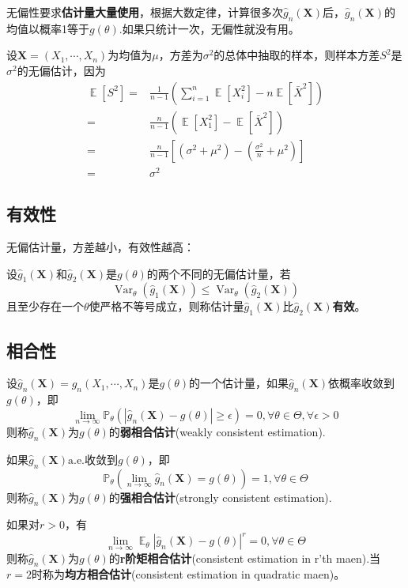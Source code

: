 \documentclass{ctexbook}
\DeclareMathOperator{\Var}{Var}          %
\DeclareMathOperator{\E}{\mathbb{E}}     %
\newcommand{\aee}{\text{a.e.}}             %
\begin{document}
无偏性要求\textbf{估计量大量使用}，根据大数定律，计算很多次$\hat{g}_n(\mathbf{X})$后，$\hat{g}_n(\mathbf{X})$的均值以概率1等于$g(\theta)$.如果只统计一次，无偏性就没有用。

\begin{example}
    设$\mathbf{X}=(X_1,\cdots,X_n)$为均值为$\mu$，方差为$\sigma^2$的总体中抽取的样本，则样本方差$S^2$是$\sigma^2$的无偏估计，因为
    \begin{align*}
        \E[S^2]=&\frac{1}{n-1}\left(\sum_{i=1}^n \E[X_i^2]-n\E[\bar{X}^2]\right)\\
        =&\frac{n}{n-1}(\E[X_1^2]-\E[\bar{X}^2])\\
        =&\frac{n}{n-1}\left[(\sigma^2+\mu^2)-\left(\frac{\sigma^2}{n}+\mu^2\right)\right]\\
        =&\sigma^2
    \end{align*}
\end{example}

\subsection{有效性}

无偏估计量，方差越小，有效性越高：

\begin{definition}[有效性]
    设$\hat{g}_1(\mathbf{X})$和$\hat{g}_2(\mathbf{X})$是$g(\theta)$的两个不同的无偏估计量，若
    $$\Var_\theta(\hat{g}_1(\mathbf{X}))\le \Var_\theta(\hat{g}_2(\mathbf{X}))$$
    且至少存在一个$\theta$使严格不等号成立，则称估计量$\hat{g}_1(\mathbf{X})$比$\hat{g}_2(\mathbf{X})$\textbf{有效}。
\end{definition}

\subsection{相合性}

\begin{definition}[相合性]
    设$\hat{g}_n(\mathbf{X})=\hat{g}_n(X_1,\cdots,X_n)$是$g(\theta)$的一个估计量，如果$\hat{g}_n(\mathbf{X})$依概率收敛到$g(\theta)$，即
    $$\lim_{n\to\infty}\mathbb{P}_\theta(|\hat{g}_n(\mathbf{X})-g(\theta)|\ge \epsilon)=0,\forall \theta\in\Theta,\forall \epsilon>0$$
    则称$\hat{g}_n(\mathbf{X})$为$g(\theta)$的\textbf{弱相合估计}(weakly consistent estimation).
    
    如果$\hat{g}_n(\mathbf{X})\aee$收敛到$g(\theta)$，即
    $$\mathbb{P}_\theta(\lim_{n\to\infty}\hat{g}_n(\mathbf{X})=g(\theta))=1,\forall \theta\in\Theta$$
    则称$\hat{g}_n(\mathbf{X})$为$g(\theta)$的\textbf{强相合估计}(strongly consistent estimation).

    如果对$r>0$，有
    $$\lim_{n\to\infty}\E_\theta|\hat{g}_n(\mathbf{X})-g(\theta)|^r=0,\forall\theta\in\Theta$$
    则称$\hat{g}_n(\mathbf{X})$为$g(\theta)$的\textbf{r阶矩相合估计}(consistent estimation in r'th maen).当$r=2$时称为\textbf{均方相合估计}(consistent estimation in quadratic maen)。
\end{definition}
\end{document}
